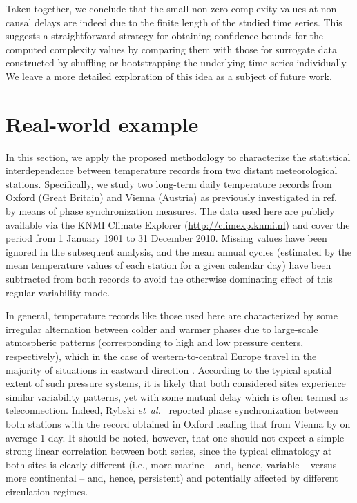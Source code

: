 \documentclass[12pt,aip,cha,reprint,nofootinbib]{revtex4-1}
\begin{document}
Taken together, we conclude that the small non-zero {\color{red}complexity} values at non-causal delays are indeed due to the finite length of the studied time series. This suggests a straightforward strategy for obtaining confidence bounds for the computed {\color{red}complexity} values by comparing them with those for surrogate data constructed by shuffling or bootstrapping the underlying time series individually. We leave a more detailed exploration of this idea as a subject of future work.


\section{Real-world example}  \label{sec:exp}
In this section, we apply the proposed methodology to characterize the statistical interdependence between temperature records from two distant meteorological stations. Specifically, we study two long-term daily temperature records from Oxford (Great Britain) and Vienna (Austria) as previously investigated in ref.~\cite{Rybski2003} by means of phase synchronization measures. The data used here are publicly available via the KNMI Climate Explorer (\url{http://climexp.knmi.nl}) and cover the period from 1 January 1901 to 31 December 2010. Missing values have been ignored in the subsequent analysis, and the mean annual cycles (estimated by the mean temperature values of each station for a given calendar day) have been subtracted from both records to avoid the otherwise dominating effect of this regular variability mode. 

In general, temperature records like those used here are characterized by some irregular alternation between colder and warmer phases due to large-scale atmospheric patterns (corresponding to high and low pressure centers, respectively), which in the case of western-to-central Europe travel in the majority of situations in eastward direction {\color{red}\cite{Barnston1987}}. According to the typical spatial extent of such pressure systems, it is likely that both considered sites experience similar variability patterns, yet with some mutual delay {\color{red} which is often termed as teleconnection}. Indeed, Rybski \emph{et~al.}~\cite{Rybski2003} reported phase synchronization between both stations with the record obtained in Oxford leading that from Vienna by on average 1 day. It should be noted, however, that one should not expect a simple strong linear correlation between both series, since the typical climatology at both sites is clearly different (i.e., more marine -- and, hence, variable -- versus more continental -- and, hence, persistent) and potentially affected by different circulation regimes.
\end{document}
